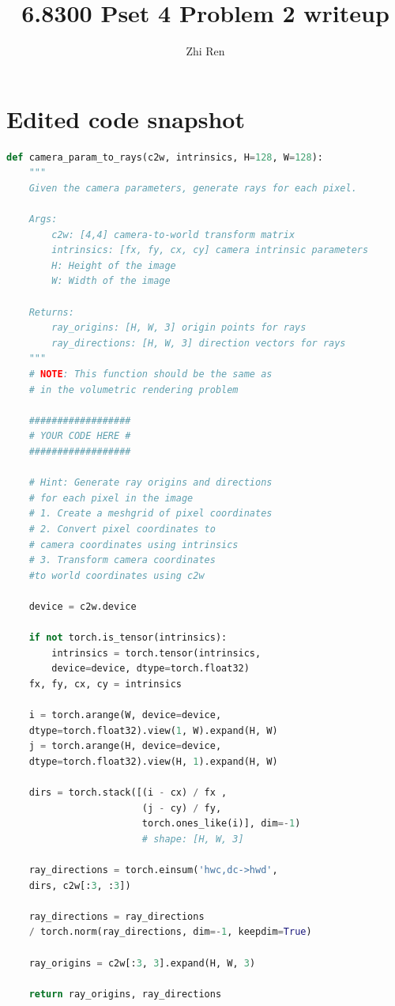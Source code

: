 \documentclass[12pt]{article}
\begin{document}
 
%
%
 
\title{6.8300 Pset 4 Problem 2 writeup} %
\author{Zhi Ren} %
\maketitle
\section{Edited code snapshot}
\begin{lstlisting}[language=python]
def camera_param_to_rays(c2w, intrinsics, H=128, W=128):
    """
    Given the camera parameters, generate rays for each pixel.

    Args:
        c2w: [4,4] camera-to-world transform matrix
        intrinsics: [fx, fy, cx, cy] camera intrinsic parameters
        H: Height of the image
        W: Width of the image

    Returns:
        ray_origins: [H, W, 3] origin points for rays
        ray_directions: [H, W, 3] direction vectors for rays
    """
    # NOTE: This function should be the same as 
    # in the volumetric rendering problem

    ##################
    # YOUR CODE HERE #
    ##################

    # Hint: Generate ray origins and directions 
    # for each pixel in the image
    # 1. Create a meshgrid of pixel coordinates
    # 2. Convert pixel coordinates to 
    # camera coordinates using intrinsics
    # 3. Transform camera coordinates 
    #to world coordinates using c2w

    device = c2w.device

    if not torch.is_tensor(intrinsics):
        intrinsics = torch.tensor(intrinsics, 
        device=device, dtype=torch.float32)
    fx, fy, cx, cy = intrinsics

    i = torch.arange(W, device=device, 
    dtype=torch.float32).view(1, W).expand(H, W)
    j = torch.arange(H, device=device, 
    dtype=torch.float32).view(H, 1).expand(H, W)

    dirs = torch.stack([(i - cx) / fx ,
                        (j - cy) / fy,
                        torch.ones_like(i)], dim=-1)  
                        # shape: [H, W, 3]

    ray_directions = torch.einsum('hwc,dc->hwd', 
    dirs, c2w[:3, :3])
    
    ray_directions = ray_directions 
    / torch.norm(ray_directions, dim=-1, keepdim=True)

    ray_origins = c2w[:3, 3].expand(H, W, 3)

    return ray_origins, ray_directions    

\end{lstlisting}
\end{document}
